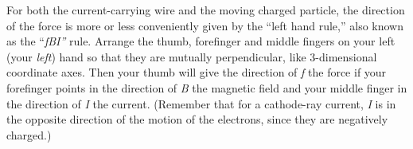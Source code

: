 For both the current-carrying wire and the moving charged particle, the
direction of the force is more or less conveniently given by the ``left
hand rule,'' also known as the ``\emph{fBI''} rule. Arrange the thumb,
forefinger and middle fingers on your left (your \emph{left}) hand so
that they are mutually perpendicular, like 3-dimensional coordinate
axes. Then your thumb will give the direction of \emph{f} the force if
your forefinger points in the direction of \emph{B} the magnetic field
and your middle finger in the direction of \emph{I} the current.
(Remember that for a cathode-ray current, \emph{I} is in the opposite
direction of the motion of the electrons, since they are negatively
charged.)
